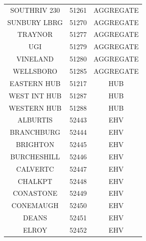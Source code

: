 \begin{table}[htb]
{\begin{tabular}{c c c}
SOUTHRIV 230 & 51261 & AGGREGATE \\
SUNBURY LBRG & 51270 & AGGREGATE \\
TRAYNOR & 51277 & AGGREGATE \\
UGI & 51279 & AGGREGATE \\
VINELAND & 51280 & AGGREGATE \\
WELLSBORO & 51285 & AGGREGATE \\
\cmidrule(lr){1-1} \cmidrule(lr){2-2} \cmidrule(lr){3-3}  
EASTERN HUB & 51217 & HUB \\
WEST INT HUB & 51287 & HUB \\
WESTERN HUB & 51288 & HUB \\
\cmidrule(lr){1-1} \cmidrule(lr){2-2} \cmidrule(lr){3-3}  	
ALBURTIS & 52443 & EHV \\
BRANCHBURG & 52444 & EHV \\
BRIGHTON & 52445 & EHV \\
BURCHESHILL & 52446 & EHV \\
CALVERTC & 52447 & EHV \\
CHALKPT & 52448 & EHV \\
CONASTONE & 52449 & EHV \\
CONEMAUGH & 52450 & EHV \\
DEANS & 52451 & EHV \\
ELROY & 52452 & EHV
	\\
\bottomrule
\end{tabular}}
\end{table}
